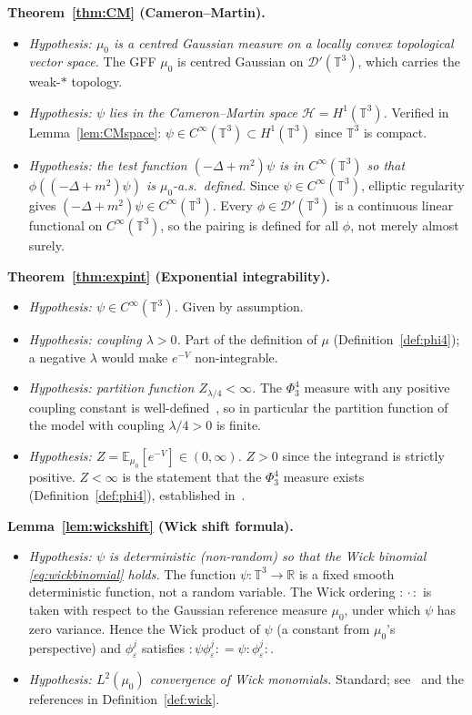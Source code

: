 \documentclass[11pt,a4paper]{article}
\theoremstyle{definition}
\newcommand{\T}{\mathbb{T}}
\newcommand{\R}{\mathbb{R}}
\newcommand{\E}{\mathbb{E}}
\newcommand{\Dc}{\mathcal{D}}
\newcommand{\Hc}{\mathcal{H}}
\newcommand{\wick}[1]{:\!#1\!:}
\begin{document}
\medskip
\noindent\textbf{Theorem~\ref{thm:CM} (Cameron--Martin).}
\begin{itemize}
\item \textit{Hypothesis: $\mu_0$ is a centred Gaussian measure on a locally convex topological vector space.}
The GFF $\mu_0$ is centred Gaussian on $\Dc'(\T^3)$, which carries the weak-$*$ topology.
\item \textit{Hypothesis: $\psi$ lies in the Cameron--Martin space $\Hc = H^1(\T^3)$.}
Verified in Lemma~\ref{lem:CMspace}: $\psi\in C^\infty(\T^3)\subset H^1(\T^3)$ since $\T^3$ is compact.
\item \textit{Hypothesis: the test function $(-\Delta+m^2)\psi$ is in $C^\infty(\T^3)$ so that $\phi((-\Delta+m^2)\psi)$ is $\mu_0$-a.s.\ defined.}
Since $\psi\in C^\infty(\T^3)$, elliptic regularity gives $(-\Delta+m^2)\psi\in C^\infty(\T^3)$.
Every $\phi\in\Dc'(\T^3)$ is a continuous linear functional on $C^\infty(\T^3)$, so the pairing is defined for all $\phi$, not merely almost surely.
\end{itemize}

\noindent\textbf{Theorem~\ref{thm:expint} (Exponential integrability).}
\begin{itemize}
\item \textit{Hypothesis: $\psi\in C^\infty(\T^3)$.}  Given by assumption.
\item \textit{Hypothesis: coupling $\lambda > 0$.}  Part of the definition of $\mu$ (Definition~\ref{def:phi4}); a negative $\lambda$ would make $e^{-V}$ non-integrable.
\item \textit{Hypothesis: partition function $Z_{\lambda/4}<\infty$.}  The $\Phi^4_3$ measure with any positive coupling constant is well-defined~\cite{GlimmJaffe1987}, so in particular the partition function of the model with coupling $\lambda/4 > 0$ is finite.
\item \textit{Hypothesis: $Z = \E_{\mu_0}[e^{-V}] \in (0,\infty)$.}  $Z>0$ since the integrand is strictly positive.  $Z<\infty$ is the statement that the $\Phi^4_3$ measure exists (Definition~\ref{def:phi4}), established in~\cite{GlimmJaffe1987,Hairer2014,GIP2015}.
\end{itemize}

\noindent\textbf{Lemma~\ref{lem:wickshift} (Wick shift formula).}
\begin{itemize}
\item \textit{Hypothesis: $\psi$ is deterministic (non-random) so that the Wick binomial \eqref{eq:wickbinomial} holds.}  The function $\psi:\T^3\to\R$ is a fixed smooth deterministic function, not a random variable.  The Wick ordering $\wick{\cdot}$ is taken with respect to the Gaussian reference measure $\mu_0$, under which $\psi$ has zero variance.  Hence the Wick product of $\psi$ (a constant from $\mu_0$'s perspective) and $\phi_\varepsilon^j$ satisfies $\wick{\psi\phi_\varepsilon^j} = \psi\wick{\phi_\varepsilon^j}$.
\item \textit{Hypothesis: $L^2(\mu_0)$ convergence of Wick monomials.}  Standard; see~\cite[Chapter~I]{Simon1974} and the references in Definition~\ref{def:wick}.
\end{itemize}
\end{document}
